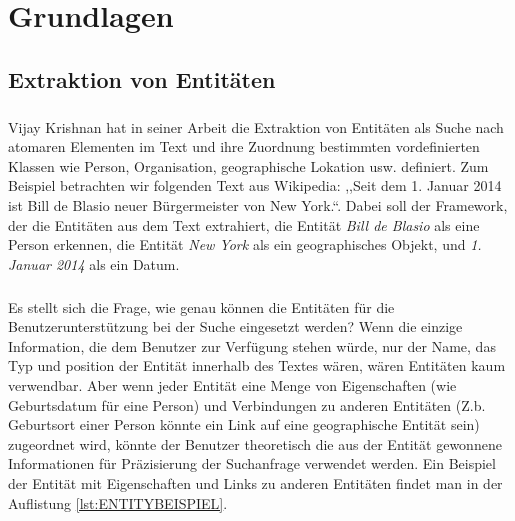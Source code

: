 \chapter{Grundlagen}
\label{sec:Grundlagen}

\section{Extraktion von Entitäten}
\paragraph{}
Vijay Krishnan hat in seiner Arbeit\cite{Vijay/Vignesh:05} die Extraktion von Entitäten als Suche nach atomaren Elementen im Text und ihre Zuordnung bestimmten vordefinierten Klassen wie Person, Organisation, geographische Lokation usw. definiert. Zum Beispiel betrachten wir folgenden Text aus Wikipedia: ,,Seit dem 1. Januar 2014 ist Bill de Blasio neuer Bürgermeister von New York.``. Dabei soll der Framework, der die Entitäten aus dem Text extrahiert, die Entität \textit{Bill de Blasio} als eine Person erkennen, die Entität \textit{New York} als ein geographisches Objekt, und \textit{1. Januar 2014} als ein Datum.

\lstset{language=java}


\paragraph{}
Es stellt sich die Frage, wie genau können die Entitäten für die Benutzerunterstützung bei der Suche eingesetzt werden? Wenn die einzige Information, die dem Benutzer zur Verfügung stehen würde, nur der Name, das Typ und position der Entität innerhalb des Textes wären, wären Entitäten kaum verwendbar. Aber wenn jeder Entität eine Menge von Eigenschaften (wie Geburtsdatum für eine Person) und Verbindungen zu anderen Entitäten (Z.b. Geburtsort einer Person könnte ein Link auf eine geographische Entität sein) zugeordnet wird, könnte der Benutzer theoretisch die aus der Entität gewonnene Informationen für Präzisierung der Suchanfrage verwendet werden. Ein Beispiel der Entität mit Eigenschaften und Links zu anderen Entitäten findet man in der Auflistung \ref{lst:ENTITYBEISPIEL}.

